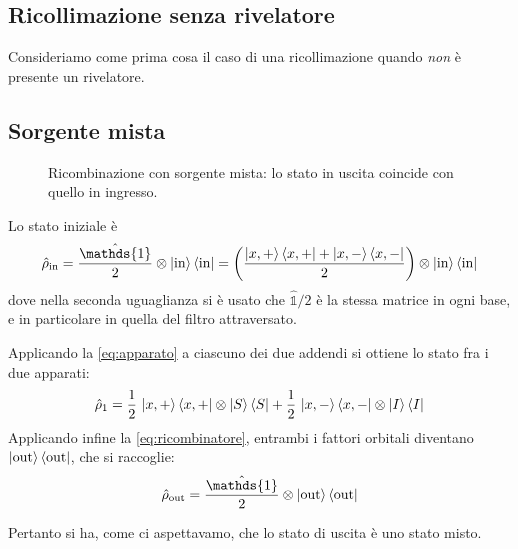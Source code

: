 \newpage

\subsection{Ricollimazione senza rivelatore}

Consideriamo come prima cosa il caso di una ricollimazione quando \emph{non} è presente un rivelatore. 

\subsection*{Sorgente mista}

\begin{figure}[htbp]
\centering
{}
\caption{Ricombinazione con sorgente mista: lo stato in uscita coincide
con quello in ingresso.}
\label{fig:ricomb-misto}
\end{figure}

Lo stato iniziale è
\begin{equation*}
    \hat{\rho}_{\text{in}} = \frac{\hat{\mathds{1}}}{2} \otimes \ketbra{\text{in}}{\text{in}}
    = \left( \frac{\ketbra{x,+}{x,+} + \ketbra{x,-}{x,-}}{2} \right)
    \otimes \ketbra{\text{in}}{\text{in}}
\end{equation*}
dove nella seconda uguaglianza si è usato che $\hat{\mathds{1}}/2$ è la stessa matrice in ogni base, e in particolare in quella del filtro attraversato.

Applicando la \eqref{eq:apparato} a ciascuno dei due addendi si ottiene lo stato fra i due apparati:
\begin{equation}
    \hat{\rho}_1 = \frac12 \, \ket{x,+}\bra{x,+} \otimes \ket{S}\bra{S}
    + \frac12 \, \ket{x,-}\bra{x,-} \otimes \ket{I}\bra{I}
    \label{eq:misto-intermedio}
\end{equation}
Applicando infine la \eqref{eq:ricombinatore}, entrambi i fattori orbitali diventano $\ket{\text{out}}\bra{\text{out}}$, che si raccoglie:
\begin{equation}
    \hat{\rho}_{\text{out}} = \frac{\hat{\mathds{1}}}{2} \otimes \ketbra{\text{out}}{\text{out}}
    \label{eq:misto-out}
\end{equation}

Pertanto si ha, come ci aspettavamo, che lo stato di uscita è uno stato misto. 

